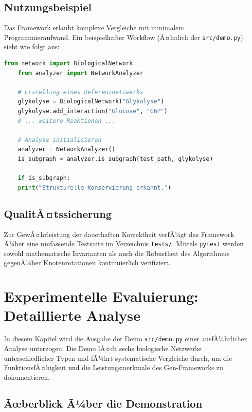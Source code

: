 ﻿\documentclass[a4paper,12pt]{article}
\theoremstyle{definition}
\begin{document}
\subsection{Nutzungsbeispiel}

Das Framework erlaubt komplexe Vergleiche mit minimalem Programmieraufwand. Ein beispielhafter Workflow (Ã¤hnlich der \texttt{src/demo.py}) sieht wie folgt aus:

\begin{lstlisting}[language=Python, caption=Beispielhafter Framework-Einsatz]
	from network import BiologicalNetwork
	from analyzer import NetworkAnalyzer
	
	# Erstellung eines Referenznetzwerks
	glykolyse = BiologicalNetwork("Glykolyse")
	glykolyse.add_interaction("Glucose", "G6P")
	# ... weitere Reaktionen ...
	
	# Analyse initialisieren
	analyzer = NetworkAnalyzer()
	is_subgraph = analyzer.is_subgraph(test_path, glykolyse)
	
	if is_subgraph:
	print("Strukturelle Konservierung erkannt.")
\end{lstlisting}

\subsection{QualitÃ¤tssicherung}

Zur GewÃ¤hrleistung der dauerhaften Korrektheit verfÃ¼gt das Framework Ã¼ber eine umfassende Testsuite im Verzeichnis \texttt{tests/}. Mittels \texttt{pytest} werden sowohl mathematische Invarianten als auch die Robustheit des Algorithmus gegenÃ¼ber Knotenrotationen kontinuierlich verifiziert.

\section{Experimentelle Evaluierung: Detaillierte Analyse}
\label{sec:demo_analysis}

In diesem Kapitel wird die Ausgabe der Demo \texttt{src/demo.py} einer ausfÃ¼hrlichen Analyse unterzogen. Die Demo lÃ¤dt sechs biologische Netzwerke unterschiedlicher Typen und fÃ¼hrt systematische Vergleiche durch, um die FunktionsfÃ¤higkeit und die Leistungsmerkmale des Gen-Frameworks zu dokumentieren.

\subsection{Ãœberblick Ã¼ber die Demonstration}
\end{document}
